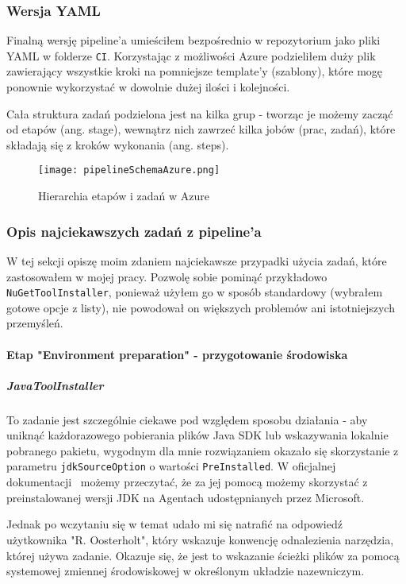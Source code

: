 \subsubsection{Wersja YAML}
Finalną wersję pipeline'a umieściłem bezpośrednio w repozytorium jako pliki YAML w folderze \verb|CI|.
Korzystając z możliwości Azure podzieliłem duży plik zawierający wszystkie kroki 
na pomniejsze template'y (szablony), które mogę ponownie wykorzystać w dowolnie dużej 
ilości i kolejności.

Cała struktura zadań podzielona jest na kilka grup - tworząc je możemy zacząć od etapów (ang. stage), 
wewnątrz nich zawrzeć kilka jobów (prac, zadań), które składają się z kroków wykonania (ang. steps).


\begin{figure}[ht]
    \texttt{[image: pipelineSchemaAzure.png]}
    \caption{Hierarchia etapów i zadań w Azure~\cite{pipelineSchemaAzure_source}}
    \label{img:pipelineSchemaAzure}
    
\end{figure}

\subsubsection{Opis najciekawszych zadań z pipeline'a}

W tej sekcji opiszę moim zdaniem najciekawsze przypadki użycia zadań, które zastosowałem 
w mojej pracy. Pozwolę sobie pominąć przykładowo \verb|NuGetToolInstaller|, ponieważ użyłem 
go w sposób standardowy (wybrałem gotowe opcje z listy), nie powodował on większych problemów
ani istotniejszych przemyśleń.

\paragraph{Etap "Environment preparation" - przygotowanie środowiska}

\subparagraph{JavaToolInstaller} \label{javaTask}
To zadanie jest szczególnie ciekawe pod względem sposobu działania - aby uniknąć każdorazowego 
pobierania plików Java SDK lub wskazywania lokalnie pobranego pakietu, wygodnym dla mnie 
rozwiązaniem okazało się skorzystanie z parametru \verb|jdkSourceOption| o wartości \verb|PreInstalled|.
W oficjalnej dokumentacji~\cite{jdkSourceOption} możemy przeczytać, że za jej pomocą możemy skorzystać 
z preinstalowanej wersji JDK na Agentach udostępnianych przez Microsoft.

Jednak po wczytaniu się w temat udało mi się natrafić na odpowiedź~\cite{javaToolInstaller_StackOverflow}
użytkownika "R. Oosterholt", który wskazuje konwencję odnalezienia narzędzia, której używa zadanie.
Okazuje się, że jest to wskazanie ścieżki plików za pomocą systemowej zmiennej środowiskowej w określonym 
układzie nazewniczym.

